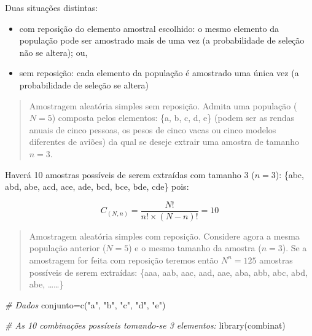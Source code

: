 \documentclass[
]{book}
\newenvironment{Shaded}{\begin{snugshade}}{\end{snugshade}}
\newcommand{\CommentTok}[1]{\textcolor[rgb]{0.56,0.35,0.01}{\textit{#1}}}
\newcommand{\FunctionTok}[1]{\textcolor[rgb]{0.00,0.00,0.00}{#1}}
\newcommand{\NormalTok}[1]{#1}
\newcommand{\OtherTok}[1]{\textcolor[rgb]{0.56,0.35,0.01}{#1}}
\newcommand{\StringTok}[1]{\textcolor[rgb]{0.31,0.60,0.02}{#1}}
\providecommand{\tightlist}{%
  \setlength{\itemsep}{0pt}\setlength{\parskip}{0pt}}
\begin{document}
\hfill\break

Duas situações distintas:

\hfill\break

\begin{itemize}
\tightlist
\item
  com reposição do elemento amostral escolhido: o mesmo elemento da população pode ser amostrado mais de uma vez (a probabilidade de seleção não se altera); ou,
\item
  sem reposição: cada elemento da população é amostrado uma única vez (a probabilidade de seleção se altera)
\end{itemize}

\hfill\break

\begin{quote}
Amostragem aleatória simples sem reposição. Admita uma população (\(N=5\)) composta pelos elementos: \{a, b, c, d, e\} (podem ser as rendas anuais de cinco pessoas, os pesos de cinco vacas ou cinco modelos diferentes de aviões) da qual se deseje extrair uma amostra de tamanho \(n=3\).
\end{quote}

\hfill\break

Haverá 10 amostras possíveis de serem extraídas com tamanho 3 (\(n=3\)): \{abc, abd, abe, acd, ace, ade, bcd, bce, bde, cde\} pois:

\hfill\break

\[
C_{(N,n)} = \frac{ N! }{ n! \times ( N-n)!}=10
\]

\hfill\break

\begin{quote}
Amostragem aleatória simples com reposição. Considere agora a mesma população anterior (\(N=5\)) e o mesmo tamanho da amostra (\(n=3\)). Se a amostragem for feita com reposição teremos então \(N^{n}=125\) amostras possíveis de serem extraídas: \{aaa, aab, aac, aad, aae, aba, abb, abc, abd, abe, \ldots\ldots\}
\end{quote}

\hfill\break

\begin{Shaded}
\begin{Highlighting}[]
\CommentTok{\# Dados}
\NormalTok{conjunto}\OtherTok{=}\FunctionTok{c}\NormalTok{(}\StringTok{"a"}\NormalTok{, }\StringTok{"b"}\NormalTok{, }\StringTok{"c"}\NormalTok{, }\StringTok{"d"}\NormalTok{, }\StringTok{"e"}\NormalTok{)}


\CommentTok{\# As 10 combinações possíveis tomando{-}se 3 elementos:}
\FunctionTok{library}\NormalTok{(combinat)}
\end{Highlighting}
\end{Shaded}
\end{document}
